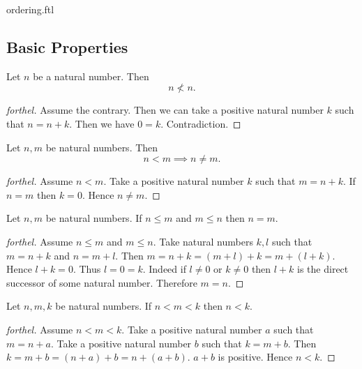 \documentclass{naproche-library}
\begin{document}
\begin{smodule}{ordering.ftl}
  \subsection*{Basic Properties}

  \begin{proposition}[forthel,id=ARITHMETIC_04_1037693395927040,printid]
    Let $n$ be a natural number.
    Then \[ n \nless n. \]
  \end{proposition}
  \begin{proof}[forthel]
    Assume the contrary.
    Then we can take a positive natural number $k$ such that $n = n + k$.
    Then we have $0 = k$.
    Contradiction.
  \end{proof}

  \begin{proposition}[forthel,id=ARITHMETIC_04_8266284905005056,printid]
    Let $n, m$ be natural numbers.
    Then \[ n < m \implies n \neq m. \]
  \end{proposition}
  \begin{proof}[forthel]
    Assume $n < m$.
    Take a positive natural number $k$ such that $m = n + k$.
    If $n = m$ then $k = 0$.
    Hence $n \neq m$.
  \end{proof}

  \begin{proposition}[forthel,id=ARITHMETIC_04_4190604718243840,printid]
    Let $n, m$ be natural numbers.
    If $n \leq m$ and $m \leq n$ then $n = m$.
  \end{proposition}
  \begin{proof}[forthel]
    Assume $n \leq m$ and $m \leq n$.
    Take natural numbers $k, l$ such that $m = n + k$ and $n = m + l$.
    Then $m
      = n + k
      = (m + l) + k
      = m + (l + k)$.
    Hence $l + k = 0$.
    Thus $l = 0 = k$.
    Indeed if $l \neq 0$ or $k \neq 0$ then $l + k$ is the direct successor of
    some natural number.
    Therefore $m = n$.
  \end{proof}

  \begin{proposition}[forthel,id=ARITHMETIC_04_6413905244979200,printid]
    Let $n, m, k$ be natural numbers.
    If $n < m < k$ then $n < k$.
  \end{proposition}
  \begin{proof}[forthel]
    Assume $n < m < k$.
    Take a positive natural number $a$ such that $m = n + a$.
    Take a positive natural number $b$ such that $k = m + b$.
    Then $k
      = m + b
      = (n + a) + b
      = n + (a + b)$.
    $a + b$ is positive.
    Hence $n < k$.
  \end{proof}


\end{smodule}
\end{document}
